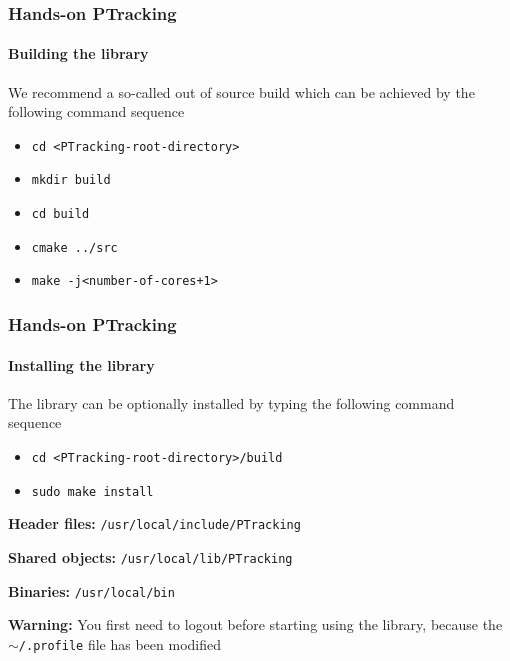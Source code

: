 \begin{frame}
	\frametitle{Hands-on PTracking}
	\framesubtitle{Building the library}
	
	We recommend a so-called out of source build which can be achieved by the following command
	sequence
	
	\vspace{0.2cm}
	
	\begin{itemize}
		\item \texttt{cd <PTracking-root-directory>}
		\item \texttt{mkdir build}
		\item \texttt{cd build}
		\item \texttt{cmake ../src}
		\item \texttt{make -j<number-of-cores+1>}
	\end{itemize}
\end{frame}

\begin{frame}
	\frametitle{Hands-on PTracking}
	\framesubtitle{Installing the library}
	
	\vspace{0.4cm}
	
	The library can be optionally installed by typing the following command sequence
	
	\vspace{0.2cm}
	
	\begin{itemize}
		\item \texttt{cd <PTracking-root-directory>/build}
		\item \texttt{sudo make install}
	\end{itemize}
	
	\vspace{0.15cm}
	
	\textbf{Header files:} \texttt{/usr/local/include/PTracking} \\
	
	\vspace{0.15cm}
	
	\textbf{Shared objects:} \texttt{/usr/local/lib/PTracking} \\
	
	\vspace{0.15cm}
	
	\textbf{Binaries:} \texttt{/usr/local/bin} \\
	
	\vspace{0.75cm}
	
	\textbf{Warning:} You first need to logout before starting using the library, because the
	\texttt{$ \sim $/.profile} file has been modified
\end{frame}

